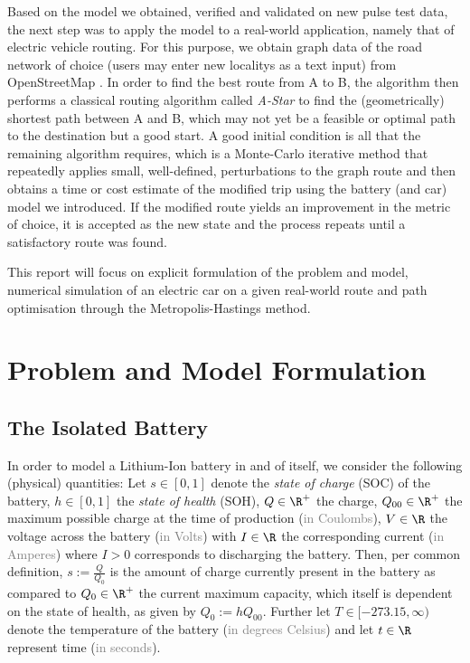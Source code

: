 \documentclass{prettytex/ox/mmsc-special-topic}
\begin{document}
  Based on the model we obtained, verified and validated on new pulse test data, the next step was to apply the model to a real-world application, namely that of electric vehicle routing.
  For this purpose, we obtain graph data of the road network of choice (users may enter new localitys as a text input) from OpenStreetMap \parencite{osm}.
  In order to find the best route from A to B, the algorithm then performs a classical routing algorithm called \emph{A-Star} to find the (geometrically) shortest path between A and B, which may not yet be a feasible or optimal path to the destination but a good start.
  A good initial condition is all that the remaining algorithm requires, which is a Monte-Carlo iterative method that repeatedly applies small, well-defined, perturbations to the graph route and then obtains a time or cost estimate of the modified trip using the battery (and car) model we introduced.
  If the modified route yields an improvement in the metric of choice, it is accepted as the new state and the process repeats until a satisfactory route was found.

  This report will focus on explicit formulation of the problem and model, numerical simulation of an electric car on a given real-world route and path optimisation through the Metropolis-Hastings method.

  \section{Problem and Model Formulation}
  \subsection{The Isolated Battery}
  In order to model a Lithium-Ion battery in and of itself, we consider the following (physical) quantities:
  Let
  $s \in [0, 1]$ denote the \textit{state of charge} (SOC) of the battery,
  $h \in [0, 1]$ the \textit{state of health} (SOH),
  $Q \in \R^+$ the charge,
  $Q_{00} \in \R^+$ the maximum possible charge at the time of production (\textcolor{gray}{in Coulombs}),
  $V \in \R$ the voltage across the battery (\textcolor{gray}{in Volts}) with
  $I \in \R$ the corresponding current (\textcolor{gray}{in Amperes}) where $I > 0$ corresponds to discharging the battery.
  Then, per common definition, $s := \frac{Q}{Q_0}$ is the amount of charge currently present in the battery as compared to $Q_0 \in \R^+$ the current maximum capacity, which itself is dependent on the state of health, as given by $Q_0 := h Q_{00}$.
  Further let
  $T \in [-273.15, \infty)$ denote the temperature of the battery (\textcolor{gray}{in degrees Celsius}) and
  let $t \in \R$ represent time (\textcolor{gray}{in seconds}).
\end{document}
